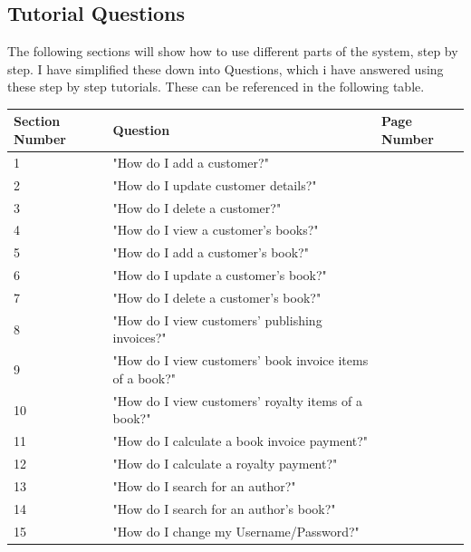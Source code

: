 \subsection{Tutorial Questions}

The following sections will show how to use different parts of the system, step by step. I have simplified these down into Questions, which i have answered using these step by step tutorials. These can be referenced in the following table.

\begin{center}
\begin{tabular}{|p{3cm}|p{3cm}|p{3cm}|}
        \hline
        \textbf{Section Number} & \textbf{Question} & \textbf{Page Number} \\ \hline
        1 & "How do I add a customer?" & \pageref{sssec:Q1} \\ \hline
        2 & "How do I update customer details?" & \pageref{sssec:Q2} \\ \hline
        3 & "How do I delete a customer?" & \pageref{sssec:Q3} \\ \hline
        4 & "How do I view a customer's books?" & \pageref{sssec:Q4} \\ \hline
        5 & "How do I add a customer's book?" & \pageref{sssec:Q5} \\ \hline
        6 & "How do I update a customer's book?" & \pageref{sssec:Q6} \\ \hline
        7 & "How do I delete a customer's book?" & \pageref{sssec:Q7} \\ \hline
        8 & "How do I view customers' publishing invoices?" & \pageref{sssec:Q8} \\ \hline
        9 & "How do I view customers' book invoice items of a book?" & \pageref{sssec:Q9} \\ \hline
        10 & "How do I view customers' royalty items of a book?" & \pageref{sssec:Q10} \\ \hline
        11 & "How do I calculate a book invoice payment?" & \pageref{sssec:Q11} \\ \hline
        12 & "How do I calculate a royalty payment?" & \pageref{sssec:Q12} \\ \hline
        13 & "How do I search for an author?" & \pageref{sssec:Q13} \\ \hline
        14 & "How do I search for an author's book?" & \pageref{sssec:Q14} \\ \hline
        15 & "How do I change my Username/Password?" & \pageref{sssec:Q15} \\ \hline
\end{tabular}
\end{center}

